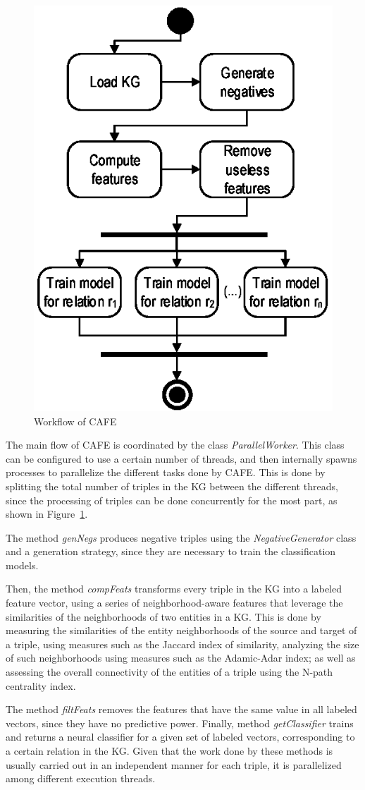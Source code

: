 \begin{figure}[!htp]
    \centering
    \includegraphics[width=.45\textwidth]{fig/cafe/CAFE-flow}
    \caption{Workflow of CAFE}
    \label{fig:cafe-flow}
\end{figure}

The main flow of CAFE is coordinated by the class \textit{ParallelWorker}. This class can be configured to use a certain number of threads, and then internally spawns processes to parallelize the different tasks done by CAFE. This is done by splitting the total number of triples in the KG between the different threads, since the processing of triples can be done concurrently for the most part, as shown in Figure~\ref{fig:cafe-flow}. 

The method \textit{genNegs} produces negative triples using the \textit{NegativeGenerator} class and a generation strategy, since they are necessary to train the classification models.

Then, the method \textit{compFeats} transforms every triple in the KG into a labeled feature vector, using a series of neighborhood-aware features that leverage the similarities of the neighborhoods of two entities in a KG. This is done by measuring the similarities of the entity neighborhoods of the source and target of a triple, using measures such as the Jaccard index of similarity, analyzing the size of such neighborhoods using measures such as the Adamic-Adar index; as well as assessing the overall connectivity of the entities of a triple using the N-path centrality index.

The method \textit{filtFeats} removes the features that have the same value in all labeled vectors, since they have no predictive power. Finally, method \textit{getClassifier} trains and returns a neural classifier for a given set of labeled vectors, corresponding to a certain relation in the KG. Given that the work done by these methods is usually carried out in an independent manner for each triple, it is parallelized among different execution threads.

